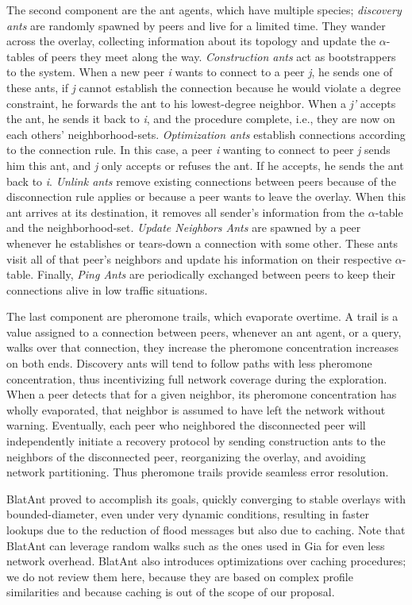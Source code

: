 \documentclass[runningheads]{llncs}
\begin{document}
The second component are the ant agents, which have multiple species; \textit{discovery ants} are randomly spawned by peers and live for a limited time. They wander across the overlay, collecting information about its topology and update the $\alpha$-tables of peers they meet along the way. \textit{Construction ants} act as bootstrappers to the system. When a new peer \textit{i} wants to connect to a peer \textit{j}, he sends one of these ants, if \textit{j} cannot establish the connection because he would violate a degree constraint, he forwards the ant to his lowest-degree neighbor. When a \textit{j'} accepts the ant, he sends it back to \textit{i}, and the procedure complete, i.e., they are now on each others' neighborhood-sets. \textit{Optimization ants} establish connections according to the connection rule. In this case, a peer \textit{i} wanting to connect to peer \textit{j} sends him this ant, and \textit{j} only accepts or refuses the ant. If he accepts, he sends the ant back to \textit{i}. \textit{Unlink ants} remove existing connections between peers because of the disconnection rule applies or because a peer wants to leave the overlay. When this ant arrives at its destination, it removes all sender's information from the $\alpha$-table and the neighborhood-set. \textit{Update Neighbors Ants} are spawned by a peer whenever he establishes or tears-down a connection with some other. These ants visit all of that peer's neighbors and update his information on their respective $\alpha$-table. Finally, \textit{Ping Ants} are periodically exchanged between peers to keep their connections alive in low traffic situations.

The last component are pheromone trails, which evaporate overtime. A trail is a value assigned to a connection between peers, whenever an ant agent, or a query, walks over that connection, they increase the pheromone concentration increases on both ends. Discovery ants will tend to follow paths with less pheromone concentration, thus incentivizing full network coverage during the exploration. When a peer detects that for a given neighbor, its pheromone concentration has wholly evaporated, that neighbor is assumed to have left the network without warning. Eventually, each peer who neighbored the disconnected peer will independently initiate a recovery protocol by sending construction ants to the neighbors of the disconnected peer, reorganizing the overlay, and avoiding network partitioning. Thus pheromone trails provide seamless error resolution.

BlatAnt proved to accomplish its goals, quickly converging to stable overlays with bounded-diameter, even under very dynamic conditions, resulting in faster lookups due to the reduction of flood messages but also due to caching. Note that BlatAnt can leverage random walks such as the ones used in Gia for even less network overhead. BlatAnt also introduces optimizations over caching procedures; we do not review them here, because they are based on complex profile similarities and because caching is out of the scope of our proposal.\newline
\end{document}
